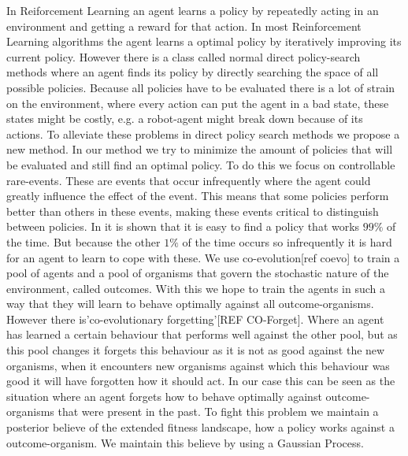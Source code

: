 In Reiforcement Learning an agent learns a policy by repeatedly acting in an environment and getting a reward for that action. In most Reinforcement Learning algorithms the agent learns a optimal policy by iteratively improving its current policy. However there is a class called normal direct policy-search methods where an agent finds its policy by directly searching the space of all possible policies. Because all policies have to be evaluated there is a lot of strain on the environment, where every action can put the agent in a bad state, these states might be costly, e.g. a robot-agent might break down because of its actions. To alleviate these problems in direct policy search methods we propose a new method. In our method we try to minimize the amount of policies that will be evaluated and still find an optimal policy. To do this we focus on controllable rare-events. These are events that occur infrequently where the agent could greatly influence the effect of the event. This means that some policies perform better than others in these events, making these events critical to distinguish between policies. In \cite{koppejan2011neuroevolutionary} it is shown that it is easy to find a policy that works $99\%$ of the time. But because the other $1\%$ of the time occurs so infrequently it is hard for an agent to learn to cope with these. 
We use co-evolution[ref coevo] to train a pool of agents and a pool of organisms that govern the stochastic nature of the environment, called outcomes. With this we hope to train the agents in such a way that they will learn to behave optimally against all outcome-organisms. However there is'co-evolutionary forgetting'[REF CO-Forget]. Where an agent has learned a certain behaviour that performs well against the other pool, but as this pool changes it forgets this behaviour as it is not as good against the new organisms, when it encounters new organisms against which this behaviour was good it will have forgotten how it should act. In our case this can be seen as the situation where an agent forgets how to behave optimally against outcome-organisms that were present in the past. To fight this problem we maintain a posterior believe of the extended fitness landscape, how a policy works against a outcome-organism. We maintain this believe by using a Gaussian Process.

